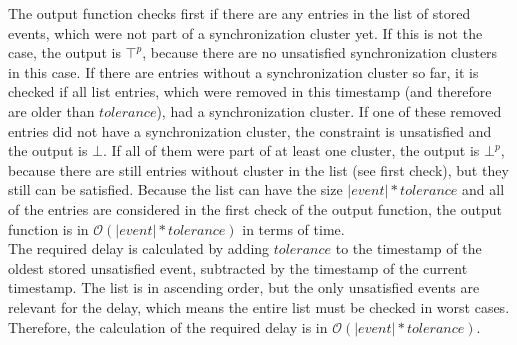 	The output function checks first if there are any entries in the list of stored events, which were not part of a synchronization cluster yet. If this is not the case, the output is $\top^p$, because there are no unsatisfied synchronization clusters in this case. If there are entries without a synchronization cluster so far, it is checked if all list entries, which were removed in this timestamp (and therefore are older than $tolerance$), had a synchronization cluster. If one of these removed entries did not have a synchronization cluster, the constraint is unsatisfied and the output is $\bot$. If all of them were part of at least one cluster, the output is $\bot^p$, because there are still entries without cluster in the list (see first check), but they still can be satisfied. Because the list can have the size $|event|*tolerance$ and all of the entries are considered in the first check of the output function, the output function is in $\mathcal{O}(|event|*tolerance)$ in terms of time.\\
	The required delay is calculated by adding $tolerance$ to the timestamp of the oldest stored unsatisfied event, subtracted by the timestamp of the current timestamp. The list is in ascending order, but the only unsatisfied events are relevant for the delay, which means the entire list must be checked in worst cases. Therefore, the calculation of the required delay is in $\mathcal{O}(|event|*tolerance)$.
	
